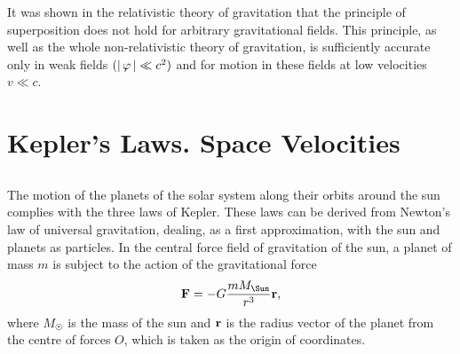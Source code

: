 It was shown in the relativistic theory of gravitation that the principle of superposition  does not hold for arbitrary gravitational fields. This principle, as well as the whole non-relativistic theory of gravitation, is sufficiently accurate only in weak fields $(\abs{\, \varphi \,} \ll c^{2})$ and for motion in these fields at low velocities $v \ll c$.


\clearpage

\section{Kepler's Laws. Space Velocities}
\label{sec-6.3}

\subsection{}\label{6.3.1} The motion of the planets of the solar system along their orbits around the sun complies with the three laws of Kepler. These laws can be derived from Newton's law of uni­versal gravitation, dealing, as a first approximation, with the sun and planets as particles. In the central force field of gravitation of the sun, a planet of mass $m$ is subject to the action of the gravitational force
\begin{equation*}%
\vb{F} = -G \frac{mM_{\Sun}}{r^{3}}\vb{r},
\end{equation*}
where $M_{\Sun}$ is the mass of the sun and $\vb{r}$ is the radius vector of the planet from the centre of forces $O$, which is taken as the origin of coordinates.

